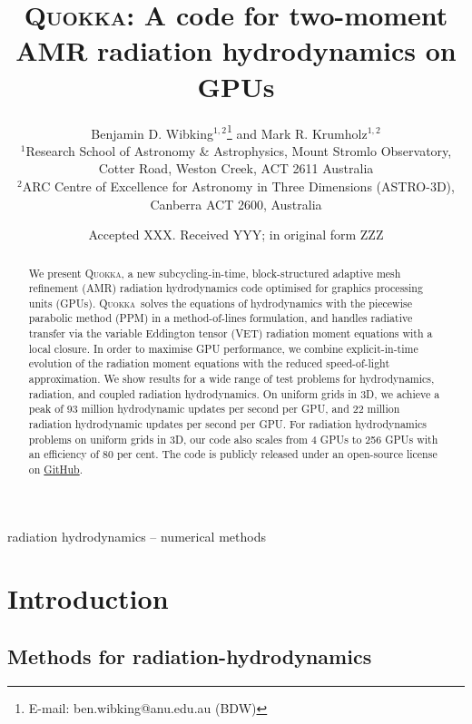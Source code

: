 \documentclass[fleqn,usenatbib]{mnras}
\title[Two-moment AMR radiation hydrodynamics on GPUs]{\textsc{Quokka}: A code for two-moment AMR radiation hydrodynamics on GPUs}
\author[B. D. Wibking et al.]{
    Benjamin D. Wibking$^{1,2}$\thanks{E-mail: ben.wibking@anu.edu.au (BDW)}
    and Mark R. Krumholz$^{1,2}$
\\
$^{1}$Research School of Astronomy \& Astrophysics, Mount Stromlo Observatory, Cotter Road, Weston Creek, ACT 2611 Australia\\
$^{2}$ARC Centre of Excellence for Astronomy in Three Dimensions (ASTRO-3D), Canberra ACT 2600, Australia
}
\date{Accepted XXX. Received YYY; in original form ZZZ}
\newcommand{\quokka}{\textsc{Quokka}}
\begin{document}
\label{firstpage}
\pagerange{\pageref{firstpage}--\pageref{lastpage}}
\maketitle

\begin{abstract}
    We present \quokka, a new subcycling-in-time, block-structured adaptive mesh refinement (AMR) radiation hydrodynamics code optimised for graphics processing units (GPUs). \quokka~solves the equations of hydrodynamics with the piecewise parabolic method (PPM) in a method-of-lines formulation, and handles radiative transfer via the variable Eddington tensor (VET) radiation moment equations with a local closure. In order to maximise GPU performance, we combine explicit-in-time evolution of the radiation moment equations with the reduced speed-of-light approximation. We show results for a wide range of test problems for hydrodynamics, radiation, and coupled radiation hydrodynamics. On uniform grids in 3D, we achieve a peak of 93 million hydrodynamic updates per second per GPU, and 22 million radiation hydrodynamic updates per second per GPU. For radiation hydrodynamics problems on uniform grids in 3D, our code also scales from 4 GPUs to 256 GPUs with an efficiency of 80 per cent. The code is publicly released under an open-source license on \faGithub\href{https://github.com/BenWibking/quokka-code}{GitHub}.
\end{abstract}

\begin{keywords}
radiation hydrodynamics -- numerical methods
\end{keywords}



\section{Introduction}


\subsection{Methods for radiation-hydrodynamics}
\end{document}
